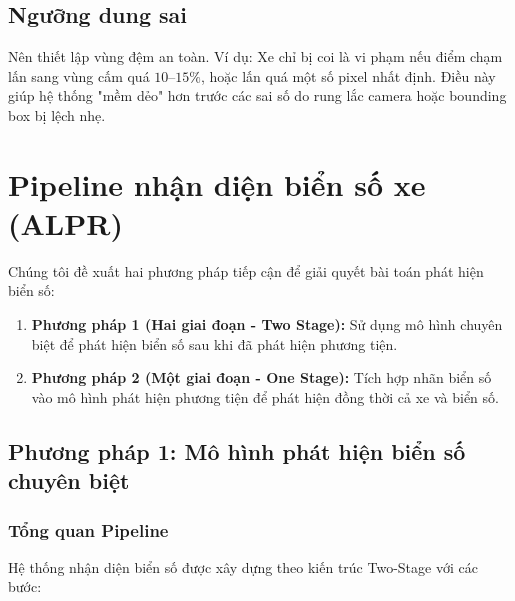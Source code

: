 \subsection{Ngưỡng dung sai}
Nên thiết lập vùng đệm an toàn. Ví dụ: Xe chỉ bị coi là vi phạm nếu điểm chạm lấn sang vùng cấm quá $10\text{--}15\%$, hoặc lấn quá một số pixel nhất định. Điều này giúp hệ thống "mềm dẻo" hơn trước các sai số do rung lắc camera hoặc bounding box bị lệch nhẹ.

\section{Pipeline nhận diện biển số xe (ALPR)}

Chúng tôi đề xuất hai phương pháp tiếp cận để giải quyết bài toán phát hiện biển số:
\begin{enumerate}
    \item \textbf{Phương pháp 1 (Hai giai đoạn - Two Stage):} Sử dụng mô hình chuyên biệt để phát hiện biển số sau khi đã phát hiện phương tiện.
    \item \textbf{Phương pháp 2 (Một giai đoạn - One Stage):} Tích hợp nhãn biển số vào mô hình phát hiện phương tiện để phát hiện đồng thời cả xe và biển số.
\end{enumerate}

\subsection{Phương pháp 1: Mô hình phát hiện biển số chuyên biệt}

\subsubsection{Tổng quan Pipeline}
Hệ thống nhận diện biển số được xây dựng theo kiến trúc Two-Stage với các bước:


